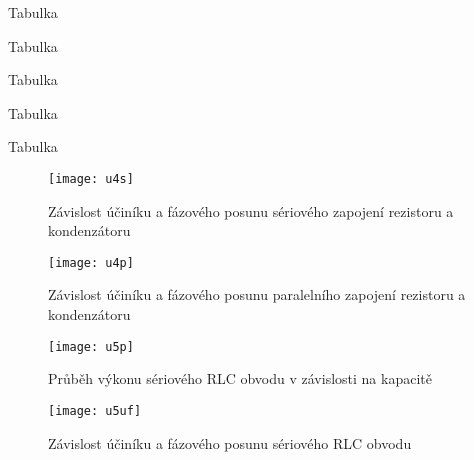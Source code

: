 \documentclass[0-protokol.tex]{subfiles}
\begin{document}
\begin{table}[H] 
\centering
\setlength{\tabcolsep}{8pt}

\caption{Tabulka}
\label{tab:u1a}
\end{table}

\begin{table}[H] 
\centering
\setlength{\tabcolsep}{8pt}

\caption{Tabulka}
\label{tab:u1d}
\end{table}

\begin{table}[H] 
\centering
\setlength{\tabcolsep}{8pt}

\caption{Tabulka}
\label{tab:u4s}
\end{table}

\begin{table}[H] 
\centering
\setlength{\tabcolsep}{8pt}

\caption{Tabulka}
\label{tab:u4p}
\end{table}

\begin{table}[H] 
\centering
\setlength{\tabcolsep}{8pt}

\caption{Tabulka}
\label{tab:u5}
\end{table}

\begin{figure}[H]
\centering
\texttt{[image: u4s]}
\caption{Závislost účiníku a fázového posunu sériového zapojení rezistoru a kondenzátoru}
\label{fig:u4s}
\end{figure}

\begin{figure}[H]
\centering
\texttt{[image: u4p]}
\caption{Závislost účiníku a fázového posunu paralelního zapojení rezistoru a kondenzátoru}
\label{fig:u4p}
\end{figure}

\begin{figure}[H]
\centering
\texttt{[image: u5p]}
\caption{Průběh výkonu sériového RLC obvodu v závislosti na kapacitě}
\label{fig:u5p}
\end{figure}

\begin{figure}[H]
\centering
\texttt{[image: u5uf]}
\caption{Závislost účiníku a fázového posunu sériového RLC obvodu}
\label{fig:u5uf}
\end{figure}
\end{document}
